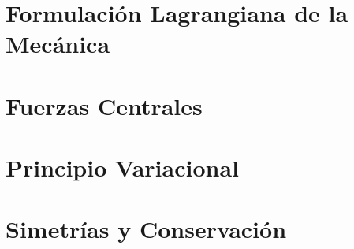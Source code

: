 \documentclass[12pt,spanish]{article}
\title{\Large \bf \Titulo}
\author{}
\date{}
\begin{document}
\thispagestyle{fancy}
\maketitle
\thispagestyle{plain}
\let\oldthefootnote\thefootnote

\let\thefootnote\oldthefootnote
\setlength{\headheight}{0.65in}
\setlength{\textheight}{8.60in}
\pagestyle{myheadings}

\vspace{-2cm}

\section[short]{Formulación Lagrangiana de la Mecánica}

\newpage
\section[short]{Fuerzas Centrales}

\newpage
\section[short]{Principio Variacional}

\newpage
\section[short]{Simetrías y Conservación}

\end{document}
